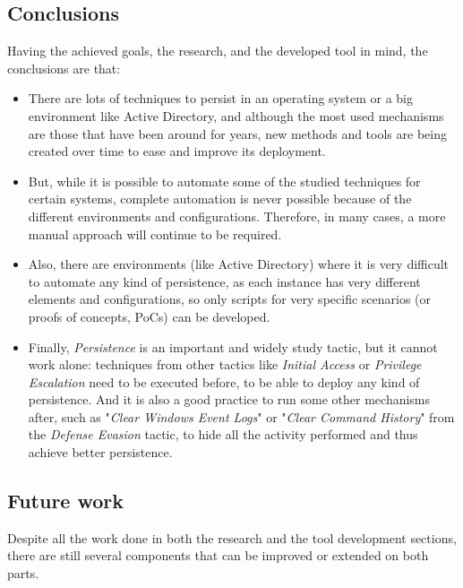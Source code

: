 \subsection{Conclusions}
Having the achieved goals, the research, and the developed tool in mind, the conclusions are that:
\begin{itemize}
\item There are lots of techniques to persist in an operating system or a big environment like Active Directory, and although the most used mechanisms are those that have been around for years, new methods and tools are being created over time to ease and improve its deployment.
\item But, while it is possible to automate some of the studied techniques for certain systems, complete automation is never possible because of the different environments and configurations. Therefore, in many cases, a more manual approach will continue to be required. 
\item Also, there are environments (like Active Directory) where it is very difficult to automate any kind of persistence, as each instance has very different elements and configurations, so only scripts for very specific scenarios (or proofs of concepts, PoCs) can be developed.

\pagebreak
\item Finally, \textit{Persistence} is an important and widely study tactic, but it cannot work alone: techniques from other tactics like \textit{Initial Access} or \textit{Privilege Escalation} need to be executed before, to be able to deploy any kind of persistence. And it is also a good practice to run some other mechanisms after, such as "\textit{Clear Windows Event Logs}" or "\textit{Clear Command History}" from the \textit{Defense Evasion} tactic, to hide all the activity performed and thus achieve better persistence.
\end{itemize}

\subsection{Future work}
\label{ssec:futureWork}
Despite all the work done in both the research and the tool development sections, there are still several components that can be improved or extended on both parts.

